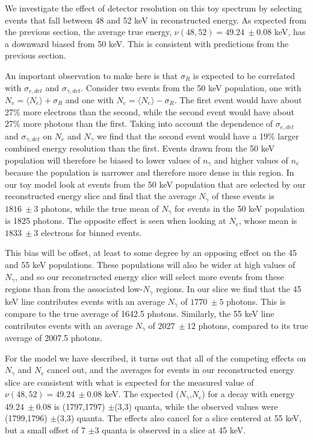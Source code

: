 We investigate the effect of detector resolution on this toy spectrum by selecting events that fall between 48 and 52 keV in reconstructed energy. As expected from the previous section, the average true energy, $\nu(48,52)=49.24 \ \pm 0.08$ keV, has a downward biased from 50 keV. This is consistent with predictions from the previous section. 

An important observation to make here is that $\sigma_R$ is expected to be correlated with $\sigma_{e,det}$ and $\sigma_{\gamma,det}$. Consider two events from the 50 keV population, one with $N_{e}=\langle N_{e} \rangle+\sigma_R$ and one with $N_{e}=\langle N_{e} \rangle-\sigma_R$. The first event would have about 27\% more electrons than the second, while the second event would have about 27\% more photons than the first. Taking into account the dependence of $\sigma_{e,det}$ and $\sigma_{\gamma,det}$ on $N_{e}$ and $N_{\gamma}$ we find that the second event would have a 19\% larger combined energy resolution than the first. Events drawn from the 50 keV population will therefore be biased to lower values of $n_{\gamma}$ and higher values of $n_e$ because the population is narrower and therefore more dense in this region. In our toy model look at events from the 50 keV population that are selected by our reconstructed energy slice and find that the average $N_{\gamma}$ of these events is $1816 \ \pm3$ photons, while the true mean of $N_{\gamma}$ for events in the 50 keV population is 1825 photons. The opposite effect is seen when looking at $N_{e}$, whose mean is $1833 \ \pm3$ electrons for binned events. 

This bias will be offset, at least to some degree by an opposing effect on the 45 and 55 keV populations. These populations will also be wider at high values of $N_{\gamma}$, and so our reconstructed energy slice will select more events from these regions than from the associated low-$N_{\gamma}$ regions. In our slice we find that the 45 keV line contributes events with an average $N_{\gamma}$ of $1770 \ \pm5$ photons. This is compare to the true average of 1642.5 photons. Similarly, the 55 keV line contributes events with an average $N_{\gamma}$ of $2027 \ \pm12$ photons, compared to its true average of 2007.5 photons.

For the model we have described, it turns out that all of the competing effects on $N_{\gamma}$ and $N_{e}$ cancel out, and the averages for events in our reconstructed energy slice are consistent with what is expected for the measured value of $\nu(48,52)=49.24 \ \pm 0.08$ keV. The expected ($N_{\gamma}$,$N_{e}$) for a decay with energy $49.24 \ \pm 0.08$ is (1797,1797) $\pm$(3,3) quanta, while the observed values were (1799,1796) $\pm$(3,3) quanta. The effects also cancel for a slice centered at 55 keV, but a small offset of 7 $\pm$3 quanta is observed in a slice at 45 keV. 

